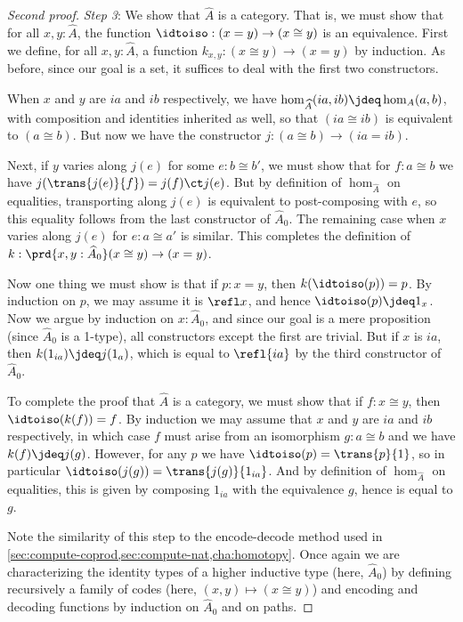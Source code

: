 \begin{proof}[Second proof]
  \mentalpause

  \emph{Step 3}: We show that $\widehat A$ is a category.
  That is, we must show that for all $x,y:\widehat A$, the function $\idtoiso:(x=y) \to (x\cong y)$ is an equivalence.
  First we define, for all $x,y:\widehat A$, a function $k_{x,y}:(x\cong y) \to (x=y)$ by induction.
  As before, since our goal is a set, it suffices to deal with the first two constructors.

  When $x$ and $y$ are $ia$ and $ib$ respectively, we have $\hom_{\widehat A}(ia,ib)\jdeq \hom_A(a,b)$, with composition and identities inherited as well, so that $(ia\cong ib)$ is equivalent to $(a\cong b)$.
  But now we have the constructor $j:(a\cong b) \to (ia=ib)$.

  Next, if $y$ varies along $j(e)$ for some $e:b\cong b'$, we must show that for $f:a\cong b$ we have $j(\trans{j(e)}{f}) = j(f) \ct j(e)$.
  But by definition of $\hom_{\widehat A}$ on equalities, transporting along $j(e)$ is equivalent to post-composing with $e$, so this equality follows from the last constructor of $\widehat A_0$.
  The remaining case when $x$ varies along $j(e)$ for $e:a\cong a'$ is similar.
  This completes the definition of $k:\prd{x,y:\widehat A_0} (x\cong y) \to (x=y)$.

  Now one thing we must show is that if $p:x=y$, then $k(\idtoiso(p))=p$.
  By induction on $p$, we may assume it is $\refl x$, and hence $\idtoiso(p)\jdeq 1_x$.
  Now we argue by induction on $x:\widehat A_0$, and since our goal is a mere proposition (since $\widehat A_0$ is a 1-type), all constructors except the first are trivial.
  But if $x$ is $ia$, then $k(1_{ia}) \jdeq j(1_a)$, which is equal to $\refl{ia}$ by the third constructor of $\widehat A_0$.

  To complete the proof that $\widehat A$ is a category, we must show that if $f:x\cong y$, then $\idtoiso(k(f))=f$.
  By induction we may assume that $x$ and $y$ are $ia$ and $ib$ respectively, in which case $f$ must arise from an isomorphism $g:a\cong b$ and we have $k(f)\jdeq j(g)$.
  However, for any $p$ we have $\idtoiso(p) = \trans{p}{1}$, so in particular $\idtoiso (j(g)) = \trans{j(g)}{1_{ia}}$.
  And by definition of $\hom_{\widehat A}$ on equalities, this is given by composing $1_{ia}$ with the equivalence $g$, hence is equal to $g$.

  Note the similarity of this step to the encode-decode method used in \cref{sec:compute-coprod,sec:compute-nat,cha:homotopy}.
  Once again we are characterizing the identity types of a higher inductive type (here, $\widehat A_0$) by defining recursively a family of codes (here, $(x,y)\mapsto (x\cong y)$) and encoding and decoding functions by induction on $\widehat A_0$ and on paths.


\end{proof}
